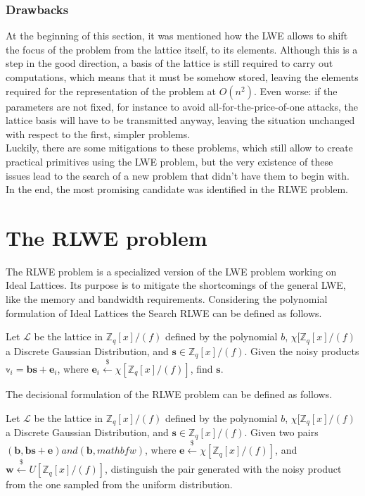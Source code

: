 \subsubsection{Drawbacks}
At the beginning of this section, it was mentioned how the LWE allows to shift the focus of the problem from the lattice itself, to its elements. Although this is a step in the good direction, a basis of the lattice is still required to carry out computations, which means that it must be somehow stored, leaving the elements required for the representation of the problem at $O(n^2)$. Even worse: if the parameters are not fixed, for instance to avoid all-for-the-price-of-one attacks, the lattice basis will have to be transmitted anyway, leaving the situation unchanged with respect to the first, simpler problems.\\
Luckily, there are some mitigations to these problems, which still allow to create practical primitives using the LWE problem, but the very existence of these issues lead to the search of a new problem that didn't have them to begin with. In the end, the most promising candidate was identified in the RLWE problem.

\section{The RLWE problem}
The RLWE problem is a specialized version of the LWE problem working on Ideal Lattices. Its purpose is to mitigate the shortcomings of the general LWE, like the memory and bandwidth requirements. Considering the polynomial formulation of Ideal Lattices the Search RLWE can be defined as follows.

\begin{definition}
Let $\mathscr{L}$ be the lattice in $\mathbb{Z}_q[x]/(f)$ defined by the polynomial $b$, $\chi[\mathbb{Z}_q[x]/(f)$ a Discrete Gaussian Distribution, and $\mathbf{s}\in\mathbb{Z}_q[x]/(f)$. Given the noisy products $\mathbb{v}_i=\mathbf{bs} + \mathbf{e}_i$, where $\mathbf{e}_i\xleftarrow{\$}\chi[\mathbb{Z}_q[x]/(f)]$, find $\mathbf{s}$.
\end{definition}

The decisional formulation of the RLWE problem can be defined as follows.

\begin{definition}
Let $\mathscr{L}$ be the lattice in $\mathbb{Z}_q[x]/(f)$ defined by the polynomial $b$, $\chi[\mathbb{Z}_q[x]/(f)$ a Discrete Gaussian Distribution, and $\mathbf{s}\in\mathbb{Z}_q[x]/(f)$. Given two pairs $(\mathbf{b},\mathbf{bs} + \mathbf{e}) and (\mathbf{b},mathbf{w})$, where $\mathbf{e}\xleftarrow{\$}\chi[\mathbb{Z}_q[x]/(f)]$, and $\mathbf{w}\xleftarrow{\$}U[\mathbb{Z}_q[x]/(f)]$, distinguish the pair generated with the noisy product from the one sampled from the uniform distribution. 
\end{definition}

